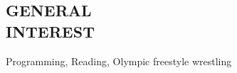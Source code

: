 \documentclass[margin]{res}
\begin{document}
\begin{resume}
\section{GENERAL\\INTEREST}
  Programming, Reading, Olympic freestyle wrestling


\end{resume}
\end{document}

